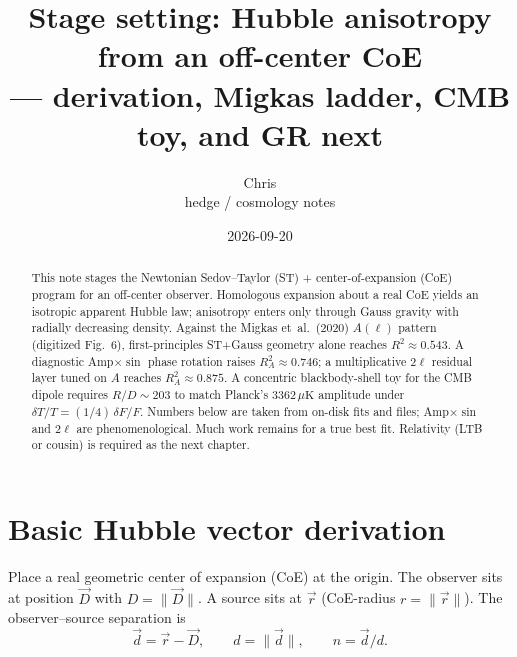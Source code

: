 \documentclass[11pt,letterpaper]{article}
\title{Stage setting: Hubble anisotropy from an off-center CoE\\
--- derivation, Migkas ladder, CMB toy, and GR next}
\author{Chris\\{\small hedge / cosmology notes}}
\date{2026-09-20}
\begin{document}
\maketitle

\begin{abstract}
This note stages the Newtonian Sedov--Taylor (ST) + center-of-expansion (CoE)
program for an off-center observer. Homologous expansion about a real CoE yields
an isotropic apparent Hubble law; anisotropy enters only through Gauss gravity
with radially decreasing density. Against the Migkas et~al.\ (2020) $A(\ell)$
pattern (digitized Fig.~6), first-principles ST+Gauss geometry alone reaches
$R^2\approx0.543$. A diagnostic Amp$\times\sin$ phase rotation raises
$R^2_A\approx0.746$; a multiplicative $2\ell$ residual layer tuned on $A$
reaches $R^2_A\approx0.875$. A concentric blackbody-shell toy for the CMB dipole
requires $R/D\sim203$ to match Planck's $3362\,\mu\mathrm{K}$ amplitude under
$\delta T/T=(1/4)\,\delta F/F$. Numbers below are taken from on-disk fits and
files; Amp$\times\sin$ and $2\ell$ are phenomenological. Much work remains for a
true best fit. Relativity (LTB or cousin) is required as the next chapter.
\end{abstract}

\tableofcontents
\newpage

\section{Basic Hubble vector derivation}
\label{sec:hubble}

Place a real geometric center of expansion (CoE) at the origin. The observer sits
at position $\vec{D}$ with $D=\|\vec{D}\|$. A source sits at $\vec{r}$
(CoE-radius $r=\|\vec{r}\|$). The observer--source separation is
\begin{equation}
\vec{d}=\vec{r}-\vec{D},\qquad d=\|\vec{d}\|,\qquad
\hat{n}=\vec{d}/d.
\end{equation}
\end{document}
